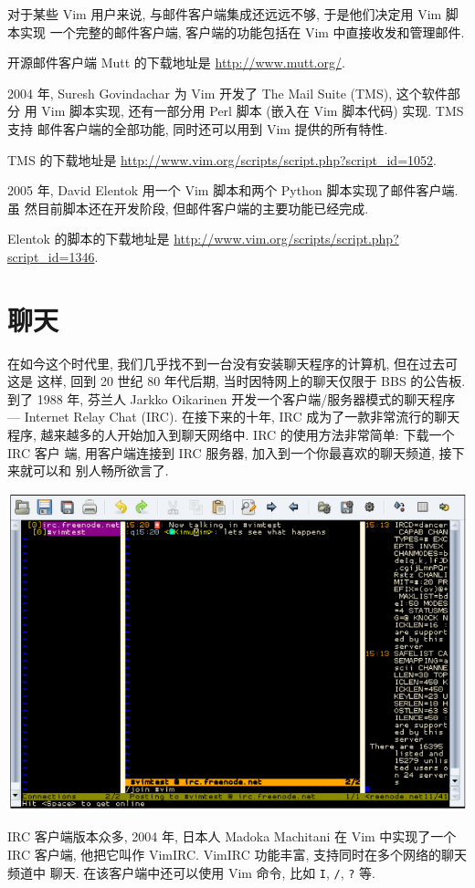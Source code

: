 对于某些 Vim 用户来说, 与邮件客户端集成还远远不够, 于是他们决定用 Vim 脚本实现
一个完整的邮件客户端, 客户端的功能包括在 Vim 中直接收发和管理邮件.

\begin{warning}
    开源邮件客户端 Mutt 的下载地址是 \url{http://www.mutt.org/}.
\end{warning}

2004 年, Suresh Govindachar 为 Vim 开发了 The Mail Suite (TMS), 这个软件部分
用 Vim 脚本实现, 还有一部分用 Perl 脚本 (嵌入在 Vim 脚本代码) 实现. TMS 支持
邮件客户端的全部功能, 同时还可以用到 Vim 提供的所有特性.

TMS 的下载地址是 \url{http://www.vim.org/scripts/script.php?script_id=1052}.

2005 年, David Elentok 用一个 Vim 脚本和两个 Python 脚本实现了邮件客户端. 虽
然目前脚本还在开发阶段, 但邮件客户端的主要功能已经完成.

Elentok 的脚本的下载地址是
\url{http://www.vim.org/scripts/script.php?script_id=1346}.

\section{聊天}
\label{sec:chat_with_vim}

在如今这个时代里, 我们几乎找不到一台没有安装聊天程序的计算机, 但在过去可这是
这样, 回到 20 世纪 80 年代后期, 当时因特网上的聊天仅限于 BBS 的公告板. 到了
1988 年, 芬兰人 Jarkko Oikarinen 开发一个客户端/服务器模式的聊天程序 ---
Internet Relay Chat (IRC). 在接下来的十年, IRC 成为了一款非常流行的聊天程序,
越来越多的人开始加入到聊天网络中. IRC 的使用方法非常简单: 下载一个 IRC 客户
端, 用客户端连接到 IRC 服务器, 加入到一个你最喜欢的聊天频道, 接下来就可以和
别人畅所欲言了.

\begin{center}
	\includegraphics[scale=0.6]{./images/page211.png}
\end{center}

IRC 客户端版本众多, 2004 年, 日本人 Madoka Machitani 在 Vim 中实现了一个 IRC
客户端, 他把它叫作 VimIRC. VimIRC 功能丰富, 支持同时在多个网络的聊天频道中
聊天. 在该客户端中还可以使用 Vim 命令, 比如 \texttt{I}, \texttt{/},
\texttt{?} 等.
